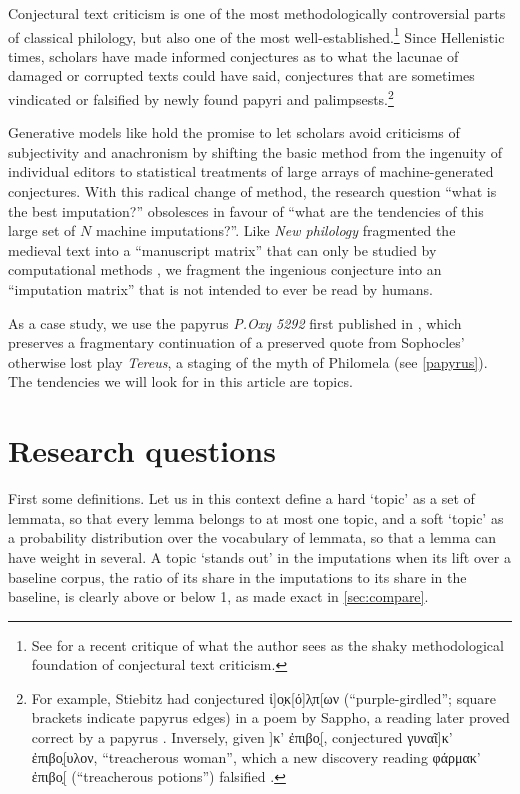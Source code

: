 \documentclass{article}
\theoremstyle{plain}
\theoremstyle{definition}
\theoremstyle{remark}
\begin{document}
Conjectural text criticism is one of the most methodologically controversial parts of classical philology, but also one of the most well-established.\footnote{See \citet{olson2020tereus} for a recent critique of what the author sees as the shaky methodological foundation of conjectural text criticism.} Since Hellenistic times, scholars have made informed conjectures as to what the lacunae of damaged or corrupted texts could have said, conjectures that are sometimes vindicated or falsified by newly found papyri and palimpsests.\footnote{For example, Stiebitz had conjectured ἰ]ο̣κ[ό]λ̣π[ων (``purple-girdled''; square brackets indicate papyrus edges) in a poem by Sappho, a reading later proved correct by a papyrus \citep{hammerstaedt2009cologne}. Inversely, given ]κ’ ἐπιβο̣[, \citet{furley2013pamphile} conjectured γυναῖ]κ’ ἐπιβο̣[υλον, ``treacherous woman'', which a new discovery reading φάρμακ’ ἐπιβο̣[ (``treacherous potions'') falsified \citep{goldberg2023menander}.} 

Generative models like \citet{cullhed2026stoicheiacharacterlevelmaskeddiffusion} hold the promise to let scholars avoid criticisms of subjectivity and anachronism by shifting the basic method from the ingenuity of individual editors \citep{conte2013ope} to statistical treatments of large arrays of machine-generated conjectures. With this radical change of method, the research question ``what is the best imputation?'' obsolesces in favour of ``what are the tendencies of this large set of $N$ machine imputations?''. Like \textit{New philology} fragmented the medieval text into a ``manuscript matrix'' that can only be studied by computational methods \citep{nichols1990philology}, we fragment the ingenious conjecture into an ``imputation matrix'' that is not intended to ever be read by humans.

As a case study, we use the papyrus \textit{P.Oxy 5292} first published in \citet{slattery2016tereus}, which preserves a fragmentary continuation of a preserved quote from Sophocles' otherwise lost play \textit{Tereus}, a staging of the myth of Philomela (see \autoref{papyrus}). The tendencies we will look for in this article are topics.

\section{Research questions}
\label{questions}

First some definitions. Let us in this context define a hard `topic' as a set of lemmata, so that every lemma belongs to at most one topic, and a soft `topic' as a probability distribution over the vocabulary of lemmata, so that a lemma can have weight in several. A topic `stands out' in the imputations when its lift over a baseline corpus, the ratio of its share in the imputations to its share in the baseline, is clearly above or below 1, as made exact in \autoref{sec:compare}.
\end{document}
